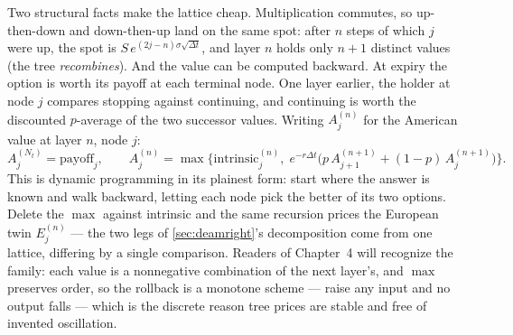 Two structural facts make the lattice cheap.  Multiplication commutes,
so up-then-down and down-then-up land on the same spot: after $n$
steps of which $j$ were up, the spot is
$S\,e^{(2j-n)\sigma\sqrt{\Delta t}}$, and layer $n$ holds only $n+1$
distinct values (the tree \emph{recombines}).  And the value can be
computed backward.  At expiry the option is worth its payoff at each
terminal node.  One layer earlier, the holder at node $j$ compares
stopping against continuing, and continuing is worth the discounted
$p$-average of the two successor values.  Writing $A^{(n)}_j$ for the
American value at layer $n$, node $j$:
\begin{equation}
A^{(N_t)}_j=\text{payoff}_j,
\qquad
A^{(n)}_j=\max\Big\{\text{intrinsic}^{(n)}_j,\;
e^{-r\Delta t}\big(p\,A^{(n+1)}_{j+1}+(1-p)\,A^{(n+1)}_{j}\big)\Big\}.
\label{eq:deamroll}
\end{equation}
This is dynamic programming in its plainest form: start where the
answer is known and walk backward, letting each node pick the better
of its two options.  Delete the $\max$ against intrinsic and the same
recursion prices the European twin $E^{(n)}_j$ --- the two legs of
\cref{sec:deamright}'s decomposition come from one lattice, differing
by a single comparison.  Readers of Chapter~4 will recognize the
family: each value is a nonnegative combination of the next layer's,
and $\max$ preserves order, so the rollback is a monotone scheme ---
raise any input and no output falls --- which is the discrete reason
tree prices are stable and free of invented oscillation.

